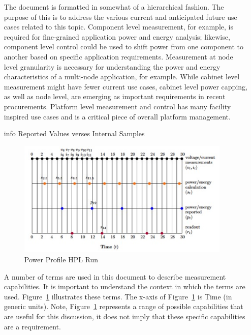 \begin{itemize}
	The document is formatted in somewhat of a hierarchical fashion. The purpose of this is to address the various current and anticipated future use cases related to this topic. Component level measurement, for example, is required for fine-grained application power and energy analysis; likewise, component level control could be used to shift power from one component to another based on specific application requirements. Measurement at node level granularity is necessary for understanding the power and energy characteristics of a multi-node application, for example. While cabinet level measurement might have fewer current use cases, cabinet level power capping, as well as node level, are emerging as important requirements in recent procurements. Platform level measurement and control has many facility inspired use cases and is a critical piece of overall platform management.

\item[{info}]
Reported Values verses Internal Samples

\begin{figure}[htbp]
\centering
\includegraphics[width=4in]{fig1}
\caption{Power Profile HPL Run}
\label{fig:powprof}
\end{figure}

A number of terms are used in this document to describe measurement capabilities. It is important to understand the context in which the terms are used. Figure~\ref{fig:powprof} illustrates these terms. The x-axis of Figure~\ref{fig:powprof} is Time (in generic units). Note, Figure~\ref{fig:powprof} represents a range of possible capabilities that are useful for this discussion, it does not imply that these specific capabilities are a requirement.


\end{itemize}
